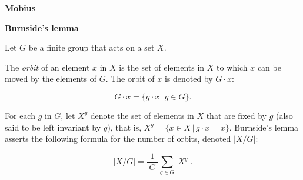 \textbf{Mobius}


\textbf{Burnside's lemma}

Let $G$ be a finite group that acts on a set $X$.

The \textit{orbit} of an element $x$ in $X$ is the set of elements
in $X$ to which $x$ can be moved by the elements of $G$.
The orbit of $x$ is denoted by $G \cdot x$:

 \[G \cdot x = \{g \cdot x\, |\, g \in G\}.\]

For each $g$ in $G$, let $X^g$ denote the set of elements
in $X$ that are fixed by $g$ (also said to be left invariant by $g$),
that is, $X^g = \{ x \in X\, |\, g \cdot x = x \}$.
Burnside's lemma asserts the following formula for the number of orbits,
denoted $|X/G|$:

\[|X/G| = \frac{1}{|G|} \sum_{g \in G} |X^g|.\]
